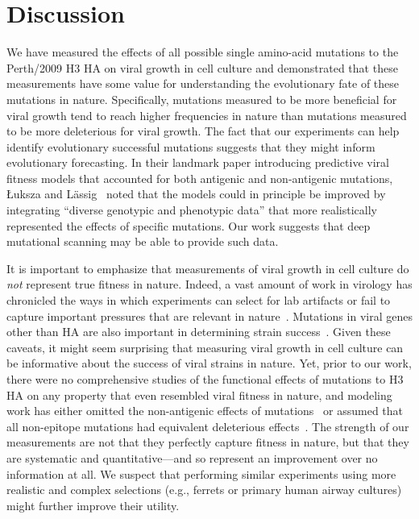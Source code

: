 \documentclass[9pt,twocolumn,twoside]{pnas-new-for-biorxiv}
\begin{document}
\section*{Discussion}
\label{sec:discussion}
We have measured the effects of all possible single amino-acid mutations to the Perth/2009 H3 HA on viral growth in cell culture and demonstrated that these measurements have some value for understanding the evolutionary fate of these mutations in nature.
Specifically, mutations measured to be more beneficial for viral growth tend to reach higher frequencies in nature than mutations measured to be more deleterious for viral growth.
The fact that our experiments can help identify evolutionary successful mutations suggests that they might inform evolutionary forecasting.
In their landmark paper introducing predictive viral fitness models that accounted for both antigenic and non-antigenic mutations, {\L}uksza and L{\"a}ssig~\cite{luksza2014predictive} noted that the models could in principle be improved by integrating ``diverse genotypic and phenotypic data'' that more realistically represented the effects of specific mutations.
Our work suggests that deep mutational scanning may be able to provide such data.

It is important to emphasize that measurements of viral growth in cell culture do \emph{not} represent true fitness in nature.
Indeed, a vast amount of work in virology has chronicled the ways in which experiments can select for lab artifacts or fail to capture important pressures that are relevant in nature~\cite{daniels1985fusion,sun2010modifications,lee2013comparison,wu2017structural}.
Mutations in viral genes other than HA are also important in determining strain success~\cite{memoli2009recent,raghwani2017selection}.
Given these caveats, it might seem surprising that measuring viral growth in cell culture can be informative about the success of viral strains in nature.
Yet, prior to our work, there were no comprehensive studies of the functional effects of mutations to H3 HA on any property that even resembled viral fitness in nature, and modeling work has either omitted the non-antigenic effects of mutations~\cite{sun2013using,harvey2016identification,neher2016prediction} or assumed that all non-epitope mutations had equivalent deleterious effects~\cite{luksza2014predictive}.
The strength of our measurements are not that they perfectly capture fitness in nature, but that they are systematic and quantitative---and so represent an improvement over no information at all.
We suspect that performing similar experiments using more realistic and complex selections (e.g., ferrets or primary human airway cultures) might further improve their utility.
\end{document}
